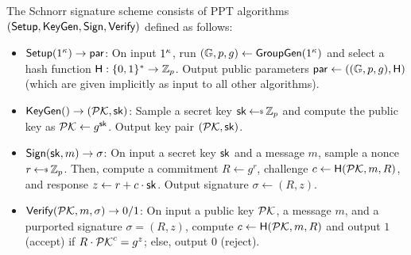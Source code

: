 \begin{definition} \label{defn:schnorr}
The Schnorr signature scheme consists of PPT algorithms $(\mathsf{Setup}, \mathsf{KeyGen}, \mathsf{Sign}, \mathsf{Verify})$ defined as follows:

  \begin{itemize}[itemsep=1mm]

    \item $\mathsf{Setup}(1^\kappa) \rightarrow \mathsf{par}$:
    On input $1^\kappa$, run $(\mathbb{G}, p, g) \gets \mathsf{GroupGen}(1^{\kappa})$ and select a hash function $\mathsf{H}: \{0,1\}^* \rightarrow \mathbb{Z}_p$. Output public parameters $\mathsf{par} \gets ((\mathbb{G}, p, g), \mathsf{H})$ (which are given implicitly as input to all other algorithms).

  \item $\mathsf{KeyGen}() \rightarrow (\mathcal{PK}, \mathsf{sk})$:
  Sample a secret key $\sk \randpick \Zp$ and compute the public key as $\mathcal{PK} \gets g^{\mathsf{sk}}$.
    Output key pair $(\mathcal{PK}, \mathsf{sk})$.

  \item $\mathsf{Sign}(\mathsf{sk}, m) \rightarrow \sigma$:
    On input a secret key $\mathsf{sk}$ and a message $m$, sample a nonce $r \randpick \Zp$. Then, compute a
     commitment $R \gets g^r$,  challenge $c \gets \mathsf{H}(\mathcal{PK}, m, R)$, and
    response $z \gets r + c \cdot \mathsf{sk}$. Output signature $\sigma \gets (R,z)$.

  \item $\mathsf{Verify}(\mathcal{PK}, m, \sigma) \rightarrow 0/1$:
  On input a public key $\mathcal{PK}$,
    a message $m$, and a purported signature $\sigma = (R, z)$, compute $c
    \leftarrow \mathsf{H}(\mathcal{PK}, m, R)$ and output $1$ (accept) if $R \cdot \mathcal{PK}^c = g^z$; else, output $0$ (reject).

\end{itemize}
\end{definition}

